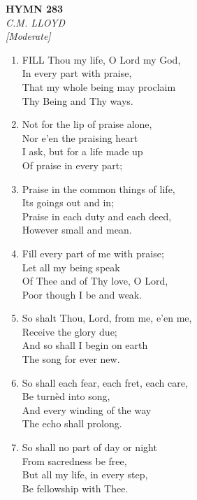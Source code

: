 \newpage
\begin{center}
    {\Large \textbf{HYMN 283}}
    \\
    \textit{C.M. LLOYD}
    \\
    \textit{\small [Moderate]}
\end{center}
\vspace{1em}

\begin{enumerate}
    \item FILL Thou my life, O Lord my God, \\
        In every part with praise, \\
        That my whole being may proclaim \\
        Thy Being and Thy ways.

    \item Not for the lip of praise alone, \\
        Nor e'en the praising heart \\
        I ask, but for a life made up \\
        Of praise in every part;

    \item Praise in the common things of life, \\
        Its goings out and in; \\
        Praise in each duty and each deed, \\
        However small and mean.

    \item Fill every part of me with praise; \\
        Let all my being speak \\
        Of Thee and of Thy love, O Lord, \\
        Poor though I be and weak.

    \item So shalt Thou, Lord, from me, e'en me, \\
        Receive the glory due; \\
        And so shall I begin on earth \\
        The song for ever new.

    \item So shall each fear, each fret, each care, \\
        Be turn\`ed into song, \\
        And every winding of the way \\
        The echo shall prolong.

    \item So shall no part of day or night \\
        From sacredness be free, \\
        But all my life, in every step, \\
        Be fellowship with Thee.

\end{enumerate}

